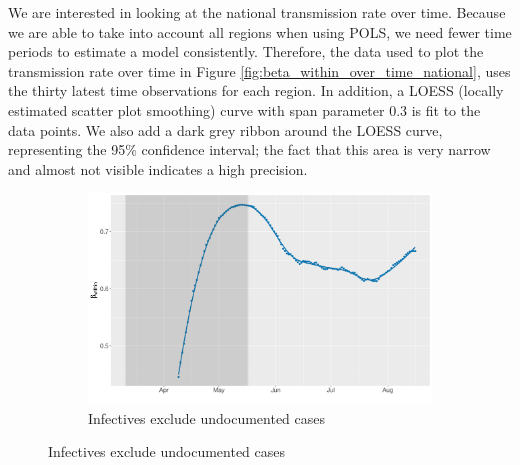 \documentclass[12pt]{article}
\begin{document}
	We are interested in looking at the national transmission rate over time. Because we are able to take into account all regions when using POLS, we need fewer time periods to estimate a model consistently. Therefore, the data used to plot the transmission rate over time in Figure \ref{fig:beta_within_over_time_national}, uses the thirty latest time observations for each region. In addition, a LOESS (locally estimated scatter plot smoothing) curve with span parameter 0.3 is fit to the data points. We also add a dark grey ribbon around the LOESS curve, representing the 95\% confidence interval; the fact that this area is very narrow and almost not visible indicates a high precision.
	
	\begin{figure}[H]
	    \centering
	    \begin{subfigure}{\textwidth}
	      \centering
	      \includegraphics[width=0.94\linewidth]{output/model_within_lag14_betawithin_National_rolling.pdf}
	      \caption{Infectives exclude undocumented cases}
	      \label{fig:beta_within_over_time_national_regular}
	    \end{subfigure}\newline
    \end{figure}
\end{document}

